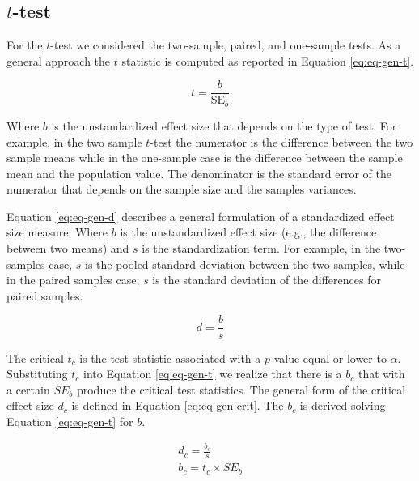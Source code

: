\documentclass[
  man,floatsintext]{apa7}
\begin{document}
\hypertarget{t-test}{%
\subsection{\texorpdfstring{\(t\)-test}{t-test}}\label{t-test}}

For the \(t\)-test we considered the two-sample, paired, and one-sample tests. As a general approach the \(t\) statistic is computed as reported in Equation \eqref{eq:eq-gen-t}.

\begin{equation}
    \label{eq:eq-gen-t}
    t = \frac{b}{\text{SE}_{b}}
\end{equation}

Where \(b\) is the unstandardized effect size that depends on the type of test. For example, in the two sample \(t\)-test the numerator is the difference between the two sample means while in the one-sample case is the difference between the sample mean and the population value. The denominator is the standard error of the numerator that depends on the sample size and the samples variances.

Equation \eqref{eq:eq-gen-d} describes a general formulation of a standardized effect size measure. Where \(b\) is the unstandardized effect size (e.g., the difference between two means) and \(s\) is the standardization term. For example, in the two-samples case, \(s\) is the pooled standard deviation between the two samples, while in the paired samples case, \(s\) is the standard deviation of the differences for paired samples.

\begin{equation}
    \label{eq:eq-gen-d}
    d = \frac{b}{s}
\end{equation}

The critical \(t_c\) is the test statistic associated with a \(p\)-value equal or lower to \(\alpha\). Substituting \(t_c\) into Equation \eqref{eq:eq-gen-t} we realize that there is a \(b_c\) that with a certain \(SE_b\) produce the critical test statistics. The general form of the critical effect size \(d_c\) is defined in Equation \eqref{eq:eq-gen-crit}. The \(b_c\) is derived solving Equation \eqref{eq:eq-gen-t} for \(b\).

\begin{equation}
\begin{gathered}
    \label{eq:eq-gen-crit}
    d_c = \frac{b_c}{s} \\
    b_c = t_c \times SE_b
\end{gathered}
\end{equation}
\end{document}
